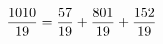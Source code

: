 \documentclass[preview]{standalone}
\begin{document}
\begin{align*}
\special{dvisvgm:raw <g id='unique000'>}\frac{1010}{19} = \frac{57}{19} + \frac{801}{19} + \frac{152}{19}\special{dvisvgm:raw </g>}
\end{align*}
\end{document}
